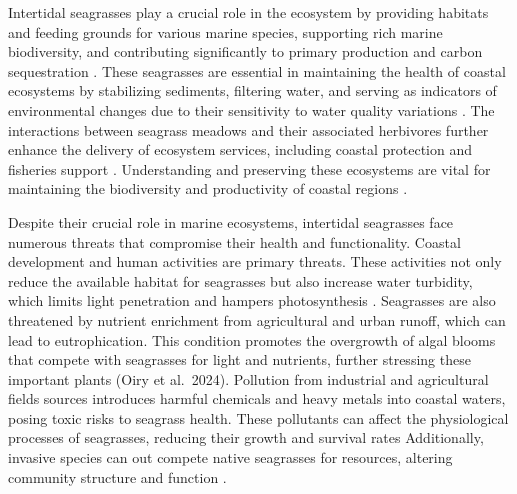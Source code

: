 \documentclass[
  number]{elsarticle}
\begin{document}
Intertidal seagrasses play a crucial role in the ecosystem by providing
habitats and feeding grounds for various marine species, supporting rich
marine biodiversity, and contributing significantly to primary
production and carbon sequestration
\citep{unsworth2022planetary, sousa2019blue}. These seagrasses are
essential in maintaining the health of coastal ecosystems by stabilizing
sediments, filtering water, and serving as indicators of environmental
changes due to their sensitivity to water quality variations
\citep{zoffoli2021decadal}. The interactions between seagrass meadows
and their associated herbivores further enhance the delivery of
ecosystem services, including coastal protection and fisheries support
\citep{jankowska2019stabilizing, zoffoli2023remote, gardner2018global}.
Understanding and preserving these ecosystems are vital for maintaining
the biodiversity and productivity of coastal regions
\citep{scott2018role, ramesh2020seagrass}.

Despite their crucial role in marine ecosystems, intertidal seagrasses
face numerous threats that compromise their health and functionality.
Coastal development and human activities are primary threats. These
activities not only reduce the available habitat for seagrasses but also
increase water turbidity, which limits light penetration and hampers
photosynthesis \citep{waycott2009accelerating}. Seagrasses are also
threatened by nutrient enrichment from agricultural and urban runoff,
which can lead to eutrophication. This condition promotes the overgrowth
of algal blooms that compete with seagrasses for light and nutrients,
further stressing these important plants \citep{thomsen2023meadow} (Oiry
et al.~2024). Pollution from industrial and agricultural fields sources
introduces harmful chemicals and heavy metals into coastal waters,
posing toxic risks to seagrass health. These pollutants can affect the
physiological processes of seagrasses, reducing their growth and
survival rates \citep{sevgi2022bitkilerde} Additionally, invasive
species can out compete native seagrasses for resources, altering
community structure and function \citep{simpson2016distribution}.
\end{document}
